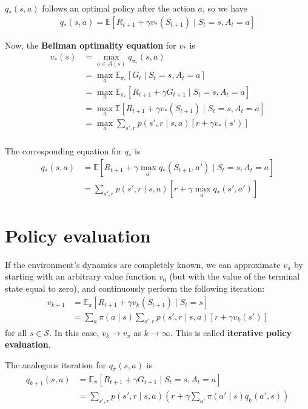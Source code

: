 \documentclass[a4paper,11pt,reqno]{amsart}
\begin{document}
$q_*(s, a)$ follows an optimal policy after the action $a$, so we have
\begin{align}
q_{*}(s, a) = \mathbb{E}\left[ R_{t+1} + \gamma v_{*}(S_{t+1}) \mid S_{t}=s, A_{t} = a \right] 
\end{align}

Now, the \textbf{Bellman optimality equation} for $v_{*}$ is
\begin{align}
    v_{*}(s) &= \max_{a \in \mathcal{A}(s)}q_{\pi _{*}}(s, a) \\
    &= \max_{a}\mathbb{E}_{\pi _{*}}\left[ G_t \mid S_t = s, A_t = a \right]  \\
    &= \max_{a} \mathbb{E}_{\pi _{*}}\left[ R_{t + 1} + \gamma G_{t+1} \mid S_t = s, A_t = a \right]  \\
    &= \max_{a}\mathbb{E}\left[ R_{t+1} + \gamma v_{*}(S_{t+1}) \mid S_t = s, A_t = a \right]  \\
    &= \max_{a}\sum_{s', r} p(s', r \mid s, a) \left[ r + \gamma v_{*}(s') \right]  \\
\end{align}

The corresponding equation for $q_{*}$ is 
\begin{align}
    q_{*}(s, a) &= \mathbb{E}\left[ R_{t+1} + \gamma \max_{a'}q_{*}(S_{t+1}, a') \;\Big | \; S_t = s, A_t = a \right] \\
    &= \sum_{s', r} p(s', r \mid s, a)\left[ r + \gamma \max_{a'}q_{*}(s', a') \right]  
\end{align}


\section*{Policy evaluation}
If the environment's dynamics are completely known, we can approximate $v_{\pi}$ by starting with an arbitrary value function $v_0$ (but with the value of the terminal state equal to zero), and continuously perform the following iteration:
\begin{align}
v_{k+1} &= \mathbb{E}_{\pi }\left[ R_{t+1} + \gamma v_{k}(S_{t+1}) \mid S_t = s \right]  \\
&= \sum_{a} \pi (a \mid s) \sum_{s', r} p(s', r \mid s, a) \left[ r + \gamma v_{k}(s') \right]
\end{align}
for all $s \in \mathcal{S}$. In this case,  $v_{k} \rightarrow v_{\pi }$ as $k \rightarrow \infty$.
This is called \textbf{iterative policy evaluation}. 

The analogous iteration for $q_{\pi }(s, a)$ is 
\begin{align}
q_{k + 1}(s, a) &= \mathbb{E}_{\pi }\left[ R_{t + 1} + \gamma G_{t + 1} \mid S_{t} = s, A_{t} = a \right]  \\
&= \sum_{s', r} p(s', r \mid s, a) \left( r + \gamma \sum_{a'} \pi(a' \mid s) q_{k}(a', s)  \right)  \\
\end{align}
\end{document}
